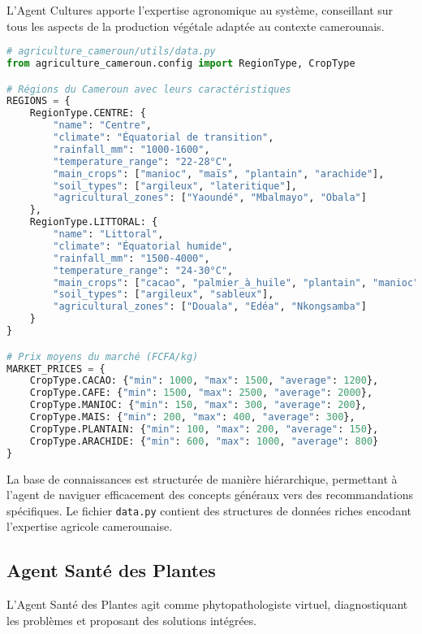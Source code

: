 L'Agent Cultures apporte l'expertise agronomique au système, conseillant sur tous les aspects de la production végétale adaptée au contexte camerounais.

 
\begin{lstlisting}[language=Python, caption=Données agricoles camerounaises]
# agriculture_cameroun/utils/data.py
from agriculture_cameroun.config import RegionType, CropType

# Régions du Cameroun avec leurs caractéristiques
REGIONS = {
    RegionType.CENTRE: {
        "name": "Centre",
        "climate": "Équatorial de transition",
        "rainfall_mm": "1000-1600",
        "temperature_range": "22-28°C",
        "main_crops": ["manioc", "maïs", "plantain", "arachide"],
        "soil_types": ["argileux", "lateritique"],
        "agricultural_zones": ["Yaoundé", "Mbalmayo", "Obala"]
    },
    RegionType.LITTORAL: {
        "name": "Littoral",
        "climate": "Équatorial humide",
        "rainfall_mm": "1500-4000",
        "temperature_range": "24-30°C",
        "main_crops": ["cacao", "palmier_à_huile", "plantain", "manioc"],
        "soil_types": ["argileux", "sableux"],
        "agricultural_zones": ["Douala", "Edéa", "Nkongsamba"]
    }
}

# Prix moyens du marché (FCFA/kg)
MARKET_PRICES = {
    CropType.CACAO: {"min": 1000, "max": 1500, "average": 1200},
    CropType.CAFE: {"min": 1500, "max": 2500, "average": 2000},
    CropType.MANIOC: {"min": 150, "max": 300, "average": 200},
    CropType.MAIS: {"min": 200, "max": 400, "average": 300},
    CropType.PLANTAIN: {"min": 100, "max": 200, "average": 150},
    CropType.ARACHIDE: {"min": 600, "max": 1000, "average": 800}
}
\end{lstlisting}

La base de connaissances est structurée de manière hiérarchique, permettant à l'agent de naviguer efficacement des concepts généraux vers des recommandations spécifiques. Le fichier \texttt{data.py} contient des structures de données riches encodant l'expertise agricole camerounaise.

\subsection{Agent Santé des Plantes}

L'Agent Santé des Plantes agit comme phytopathologiste virtuel, diagnostiquant les problèmes et proposant des solutions intégrées.

